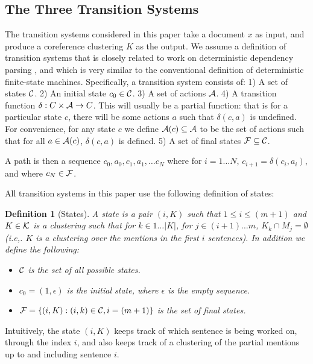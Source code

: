 \documentclass[11pt,a4paper]{article}
\newtheorem{definition}{Definition}
\begin{document}
\subsection{The Three Transition Systems}
\label{sec:three-systems}

The transition systems considered in this paper take a document $x$ as input, and produce a coreference clustering $K$ as the output. We  assume a definition of transition systems that is closely related to work on deterministic dependency parsing \cite{nivre-2003-efficient,nivre-2008-algorithms}, and which is very similar to the conventional definition of deterministic finite-state machines. Specifically, a transition system consists of: 1) A set of states ${\cal C}$. 2) An initial state $c_0 \in {\cal C}$. 3) A  set of actions ${\cal A}$. 4) A transition function $\delta: C \times {\cal A} \rightarrow C$. This will usually be a partial function: that is for a particular state $c$, there will be some actions $a$ such that $\delta(c, a)$ is undefined. For convenience, for any state $c$ we define ${\cal A}(c) \subseteq {\cal A}$ to be the set of actions such that for all $a \in {\cal A}(c)$, $\delta(c, a)$ is defined. 5) A set of final states ${\cal F} \subseteq {\cal C}$.

A path is then a sequence $c_0, a_0, c_1, a_1, \ldots c_N$ where for $i = 1 \ldots N$, $c_{i+1} = \delta(c_{i}, a_i)$, and where $c_N \in {\cal F}$.

All transition systems in this paper use the following definition of states:
\begin{definition}[States]
\label{defn:states}
A state is a pair $(i, K)$ such that $1 \leq i \leq (m+1)$ and $K \in {\cal K}$ is a clustering such that for $k \in 1 \ldots |K|$, for $j \in (i+1) \ldots m$, $K_k \cap M_j = \emptyset$ (i.e,. $K$ is a clustering over the mentions in the first $i$ sentences). In addition we define the following:

\begin{itemize}
    \item  ${\cal C}$ is the set of all possible states.
    \item $c_0 = (1, \epsilon)$ is the initial state, where $\epsilon$ is the empty sequence.
    \item ${\cal F} = \{ (i, K): (i, k) \in {\cal C}, i = (m+1)\}$ is the set of final states.
\end{itemize}
\end{definition}
Intuitively, the state $(i, K)$ keeps track of which sentence is being worked on, through the index $i$, and also keeps track of a clustering of the partial mentions up to and including sentence $i$. 
\end{document}
